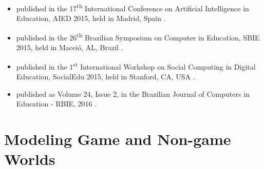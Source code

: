 \begin{itemize}
\item
{} published in the 17\textsuperscript{th} International Conference on Artificial Intelligence in Education, AIED 2015, held in Madrid, Spain \cite{ChallcoMizoguchiBittencourtIsotani2015a}.

\item
{} published in the 26\textsuperscript{th} Brazilian Symposium on Computer in Education, SBIE 2015, held in Maceió, AL, Brazil \cite{ChallcoAndradeOliveiraMizoguchiIsotani2015}.

\item
{} published in the 1\textsuperscript{st} International Workshop on Social Computing in Digital Education, SocialEdu 2015, held in Stanford, CA, USA \cite{ChallcoMizoguchiBittencourtIsotani2016}.

\item
{} published as Volume 24, Issue 2, in the Brazilian Journal of Computers in Education - RBIE, 2016 \cite{ChallcoMizoguchiIsotani2016}.
\end{itemize}

\section{Modeling Game and Non-game Worlds}
\label{sec:modeling-game-non-game-worlds}

